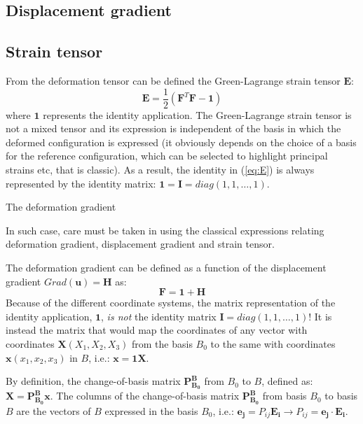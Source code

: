 \documentclass[letterpaper,12pt,oneside]{report}
\begin{document}
\subsection{Displacement gradient}


\subsection{Strain tensor}
From the deformation tensor can be defined the Green-Lagrange strain tensor $\mathbf{E}$:
\begin{equation}
\mathbf{E} = \frac{1}{2}\left(\mathbf{F}^T \mathbf{F} - \mathbf{1}\right)
\label{eq:E}
\end{equation}
where $\mathbf{1}$ represents the identity application. The Green-Lagrange strain tensor is not a mixed tensor and its expression is independent of the basis in which the deformed configuration is expressed (it obviously depends on the choice of a basis for the reference configuration, which can be selected to highlight principal strains etc, that is classic). As a result, the identity in (\ref{eq:E}) is always represented by the identity matrix: $\mathbf{1} = \mathbf{I} = diag(1,1,\dots,1)$.

 The deformation gradient 



In such case, care must be taken in using the classical expressions relating deformation gradient, displacement gradient and strain tensor.

The deformation gradient can be defined as a function of the displacement gradient $Grad(\mathbf{u})=\mathbf{H}$ as:
\begin{equation}
\mathbf{F} = \mathbf{1} + \mathbf{H}
\end{equation}
Because of the different coordinate systems, the matrix representation of the identity application, $\mathbf{1}$, \emph{is not} the identity matrix $\mathbf{I} = diag(1,1,\dots,1)$! It is instead the matrix that would map the coordinates of any vector with coordinates $\mathbf{X}(X_1,X_2,X_3)$ from the basis $B_0$ to the same with coordinates $\mathbf{x}(x_1,x_2,x_3)$ in $B$, i.e.: $\mathbf{x} = \mathbf{1} \mathbf{X}$. 

By definition, the change-of-basis matrix $\mathbf{P_{B_0}^B}$ from $B_0$ to $B$, defined as: $\mathbf{X} = \mathbf{P_{B_0}^B} \mathbf{x}$. The columns of the change-of-basis matrix $\mathbf{P_{B_0}^B}$ from basis $B_0$ to basis $B$ are the vectors of $B$ expressed in the basis $B_0$, i.e.: $\mathbf{e_j} = P_{ij}\mathbf{E_i} \rightarrow P_{ij} = \mathbf{e_j} \cdot \mathbf{E_i}$.
\end{document}
